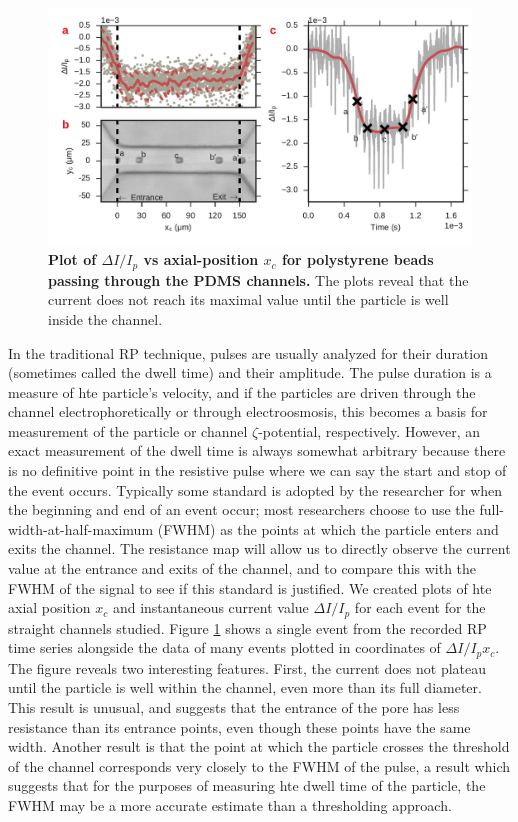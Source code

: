 				\begin{figure}
					\includegraphics[width=1\textwidth]{channelentrancestraight.pdf}
					\caption{\textbf{Plot of $\Delta I/I_{p}$ vs axial-position $x_{c}$ for polystyrene beads passing through the PDMS channels.} The plots reveal that the current does not reach its maximal value until the particle is well inside the channel.}
					\label{fig:channelentrancestraight}
				\end{figure}

			
				In the traditional RP technique, pulses are usually analyzed for their duration (sometimes called the dwell time) and their amplitude. The pulse duration is a measure of hte particle's velocity, and if the particles are driven through the channel electrophoretically or through electroosmosis, this becomes a basis for measurement of the particle or channel $\zeta$-potential, respectively. However, an exact measurement of the dwell time is always somewhat arbitrary because there is no definitive point in the resistive pulse where we can say the start and stop of the event occurs. Typically some standard is adopted by the researcher for when the beginning and end of an event occur; most researchers choose to use the full-width-at-half-maximum (FWHM) as the points at which the particle enters and exits the channel. The resistance map will allow us to directly observe the current value at the entrance and exits of the channel, and to compare this with the FWHM of the signal to see if this standard is justified. We created plots of hte axial position $x_{c}$ and instantaneous current value $\Delta I/I_{p}$ for each event for the straight channels studied. Figure \ref{fig:channelentrancestraight} shows a single event from the recorded RP time series alongside the data of many events plotted in coordinates of $\Delta I/I_{p} x_{c}$. The figure reveals two interesting features. First, the current does not plateau until the particle is well within the channel, even more than its full diameter. This result is unusual, and suggests that the entrance of the pore has less resistance than its entrance points, even though these points have the same width. Another result is that the point at which the particle crosses the threshold of the channel corresponds very closely to the FWHM of the pulse, a result which suggests that for the purposes of measuring hte dwell time of the particle, the FWHM may be a more accurate estimate than a thresholding approach.
				
